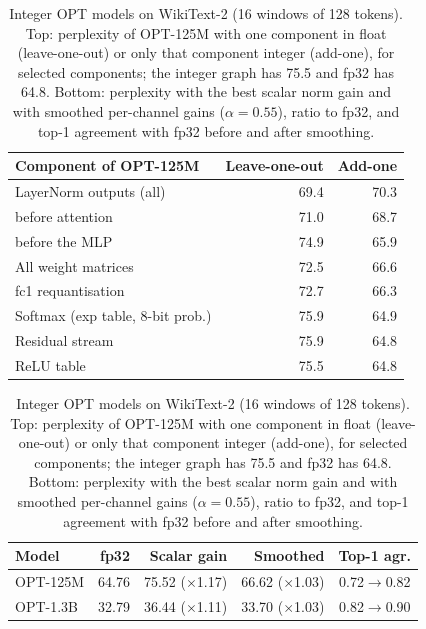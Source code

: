 \begin{table}[t]
  \caption{Integer OPT models on WikiText-2 (16 windows of 128 tokens). Top: perplexity of
  OPT-125M with one component in float (leave-one-out) or only that component integer (add-one),
  for selected components; the integer graph has 75.5 and fp32 has 64.8. Bottom: perplexity with the best scalar norm gain
  and with smoothed per-channel gains ($\alpha=0.55$), ratio to fp32, and top-1 agreement with
  fp32 before and after smoothing.}
  \label{tab:quality}
  \centering\footnotesize
  \setlength{\tabcolsep}{4pt}
  \begin{tabular}{@{}lrr@{}}
    \toprule
    Component of OPT-125M & Leave-one-out & Add-one \\
    \midrule
    LayerNorm outputs (all)            & 69.4 & 70.3 \\
    \quad before attention             & 71.0 & 68.7 \\
    \quad before the MLP               & 74.9 & 65.9 \\
    All weight matrices                & 72.5 & 66.6 \\
    fc1 requantisation                 & 72.7 & 66.3 \\
    Softmax (exp table, 8-bit prob.)   & 75.9 & 64.9 \\
    Residual stream                    & 75.9 & 64.8 \\
    ReLU table                         & 75.5 & 64.8 \\
    \bottomrule
  \end{tabular}

  \vspace{6pt}
  \begin{tabular}{@{}lrrrc@{}}
    \toprule
    Model & fp32 & Scalar gain & Smoothed & Top-1 agr. \\
    \midrule
    OPT-125M & 64.76 & 75.52 ($\times$1.17) & 66.62 ($\times$1.03) & 0.72$\to$0.82 \\
    OPT-1.3B & 32.79 & 36.44 ($\times$1.11) & 33.70 ($\times$1.03) & 0.82$\to$0.90 \\
    \bottomrule
  \end{tabular}
\end{table}


